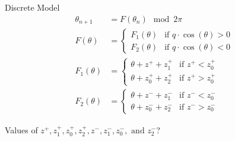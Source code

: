 \begin{frame}{Discrete Model}
    \vspace{-2em}
    \begin{align*}
        \theta_{n+1} & =  F(\theta_n) \mod 2 \pi
        \\
        F(\theta)    & = \begin{cases}
                            F_1(\theta) & \text{if } q \cdot \cos(\theta) > 0 \\
                            F_2(\theta) & \text{if } q \cdot \cos(\theta) < 0
                        \end{cases}
        \\
        F_1(\theta)  & = \begin{cases}
                            \theta + z^{+} + z_{1}^{+}     & \text{if } z^{+} < z_{0}^{+} \\
                            \theta + z_{0}^{+} + z_{2}^{+} & \text{if } z^{+} > z_{0}^{+}
                        \end{cases}
        \\
        F_2(\theta)  & = \begin{cases}
                            \theta + z^{-} + z_{1}^{-}     & \text{if } z^{-} < z_{0}^{-} \\
                            \theta + z_{0}^{-} + z_{2}^{-} & \text{if } z^{-} > z_{0}^{-}
                        \end{cases}
    \end{align*}

    \vspace{1em}
    Values of $ z^{+}, z_{1}^{+}, z_{0}^{+}, z_{2}^{+}, z^{-}, z_{1}^{-}, z_{0}^{-}, \text{ and } z_{2}^{-}$?
\end{frame}

